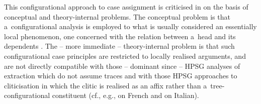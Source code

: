 \documentclass[output=paper]{langsci/langscibook}
\begin{document}
This configurational approach to case assignment is criticised in \citealt{prze:96,Prze99,Prze99b} on the basis of conceptual and theory-internal problems.  The conceptual problem is that a~configurational analysis is employed to what is usually considered an essentially local phenomenon, one concerned with the relation between a~head and its dependents \citep{blak:94}.  The – more immediate – theory-internal problem is that such configurational case principles are restricted to locally realised arguments, and are not directly compatible with those – dominant since \citealt[Chapter~9]{ps2} – HPSG analyses of extraction which do not assume traces and with those HPSG approaches to cliticisation in which the clitic is realised as an affix rather than a~tree-configurational constituent (cf., e.g., \citealt{MS97a-u} on French and \citealt{Monachesi99a-u} on Italian).
\end{document}
